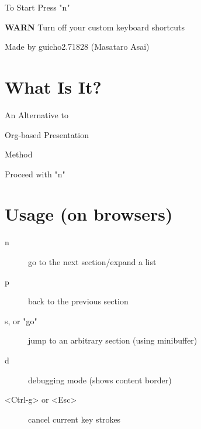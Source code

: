 \begin{outline-text-1}
\begin{xlarge}
\begin{center}
To Start Press "n"
\end{center}
\end{xlarge}

\begin{center}
\textbf{WARN} Turn off your custom keyboard shortcuts
\end{center}

\begin{note}
\begin{alignright}
Made by guicho2.71828 (Masataro Asai)
\end{alignright}
\end{note}
\end{outline-text-1}

\section{What Is It?}
\label{sec-1}

\begin{xlarge}
An Alternative to
\begin{center}
Org-based Presentation
\end{center}
\begin{alignright}
Method
\end{alignright}
\end{xlarge}

\begin{center}
Proceed with "n"
\end{center}
\section{Usage (on browsers)}
\label{sec-2}

\begin{smaller}
\begin{description}
\item[{n}] go to the next section/expand a list
\item[{p}] back to the previous section
\item[{s, or "go"}] jump to an arbitrary section (using minibuffer)
\item[{d}] debugging mode (shows content border)
\item[{<Ctrl-g> or <Esc>}] cancel current key strokes
\end{description}
\end{smaller}
